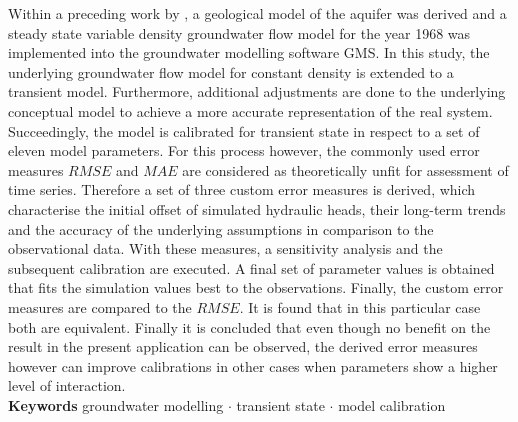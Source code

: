 Within a preceding work by \textcite{Horn.2021}, a geological model of the aquifer was derived and a steady state variable density groundwater flow model for the year 1968 was implemented into the groundwater modelling software GMS. In this study, the underlying groundwater flow model for constant density is extended to a transient model. Furthermore, additional adjustments are done to the underlying conceptual model to achieve a more accurate representation of the real system.   Succeedingly, the model is calibrated for transient state in respect to a set of eleven model parameters. For this process however, the commonly used error measures $RMSE$ and $MAE$ are considered as theoretically unfit for assessment of time series. Therefore a set of three custom error measures is derived, which characterise the initial offset of simulated hydraulic heads, their long-term trends and the accuracy of the underlying assumptions in comparison to the observational data. With these measures, a sensitivity analysis and the subsequent calibration are executed. A final set of parameter values is obtained that fits the simulation values best to the observations. Finally, the custom error measures are compared to the $RMSE$. It is found that in this particular case both are equivalent. Finally it is concluded that even though no benefit on the result in the present application can be observed, the derived error measures however can improve calibrations in other cases when parameters show a higher level of interaction.\\[1.0cm]
\vspace{0.5cm}
\textbf{Keywords} \hspace{0.3cm} groundwater modelling $\cdot$ transient state $\cdot$ model calibration